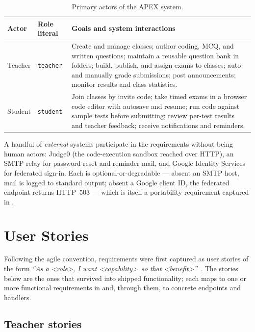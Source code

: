 \begin{table}[htbp]
\centering
\caption{Primary actors of the APEX system.}
\label{tab:actors}
\small
\begin{tabularx}{\textwidth}{@{}L{2.4cm} L{3.2cm} X@{}}
\toprule
\textbf{Actor} & \textbf{Role literal} & \textbf{Goals and system interactions} \\
\midrule
Teacher & \texttt{teacher} &
Create and manage classes; author coding, MCQ, and written questions; maintain a
reusable question bank in folders; build, publish, and assign exams to classes;
auto- and manually grade submissions; post announcements; monitor results and class
statistics. \\
\addlinespace
Student & \texttt{student} &
Join classes by invite code; take timed exams in a browser code editor with autosave
and resume; run code against sample tests before submitting; review per-test results
and teacher feedback; receive notifications and reminders. \\
\bottomrule
\end{tabularx}
\end{table}

A handful of \emph{external} systems participate in the requirements without being
human actors: Judge0 (the code-execution sandbox reached over HTTP), an SMTP relay for
password-reset and reminder mail, and Google Identity Services for federated sign-in.
Each is optional-or-degradable --- absent an SMTP host, mail is logged to standard
output; absent a Google client ID, the federated endpoint returns HTTP~503 --- which is
itself a portability requirement captured in .

\section{User Stories}
\label{sec:req-stories}

Following the agile convention, requirements were first captured as user stories of the
form \emph{``As a \textless role\textgreater, I want \textless capability\textgreater\
so that \textless benefit\textgreater''}~\cite{pressman-se}. The stories below are the
ones that survived into shipped functionality; each maps to one or more functional
requirements in \Cref{sec:req-fr} and, through them, to concrete endpoints and handlers.

\subsection*{Teacher stories}

